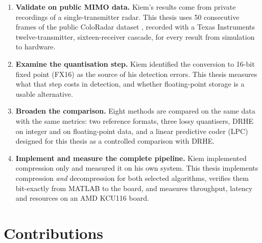 \begin{enumerate}
\item \textbf{Validate on public MIMO data.} Kiem's results come from private
recordings of a single-transmitter radar. This thesis uses 50 consecutive
frames of the public ColoRadar dataset \cite{kramer2022}, recorded with a Texas
Instruments twelve-transmitter, sixteen-receiver cascade, for every result
from simulation to hardware.

\item \textbf{Examine the quantisation step.} Kiem identified the conversion to
16-bit fixed point (FX16) as the source of his detection errors. This thesis
measures what that step costs in detection, and whether floating-point storage
is a usable alternative.

\item \textbf{Broaden the comparison.} Eight methods are compared on the same
data with the same metrics: two reference formats, three lossy quantisers, DRHE
on integer and on floating-point data, and a linear predictive coder (LPC)
designed for this thesis as a controlled comparison with DRHE.

\item \textbf{Implement and measure the complete pipeline.} Kiem implemented
compression only and measured it on his own system. This thesis implements
compression \emph{and} decompression for both selected algorithms, verifies them
bit-exactly from MATLAB to the board, and measures throughput, latency and
resources on an AMD KCU116 board.
\end{enumerate}

\section{Contributions}
\label{sec:contributions}


